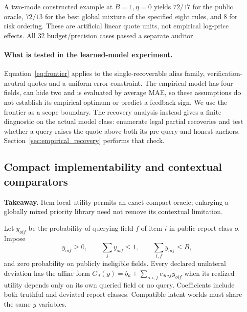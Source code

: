\documentclass[11pt]{article}
\begin{document}
A two-mode constructed example at $B=1,\eta=0$ yields $72/17$ for the public
oracle, $72/13$ for the best global mixture of the specified eight rules, and
$8$ for risk ordering. These are artificial linear quote units, not empirical
log-price effects. All 32 budget/precision cases passed a separate auditor.

\paragraph{What is tested in the learned-model experiment.}
Equation~\eqref{eq:frontier} applies to the single-recoverable alias family,
verification-neutral quotes and a uniform error constraint. The empirical
model has four fields, can hide two and is evaluated by average MAE, so these
assumptions do not establish its empirical optimum or predict a feedback sign.
We use the frontier as a scope boundary. The recovery analysis instead gives
a finite diagnostic on the actual model class: enumerate legal partial
recoveries and test whether a query raises the quote above both its pre-query
and honest anchors. Section~\ref{sec:empirical_recovery} performs that check.

\subsection{Compact implementability and contextual comparators}
\noindent\textbf{Takeaway.} Item-local utility permits an exact compact oracle;
enlarging a globally mixed priority library need not remove its contextual limitation.

Let $y_{oif}$ be the probability of querying field $f$ of item $i$ in public
report class $o$. Impose
\[
y_{oif}\ge0,\qquad \sum_f y_{oif}\le1,\qquad
\sum_{i,f}y_{oif}\le B,
\]
and zero probability on publicly ineligible fields. Every declared unilateral
deviation has the affine form $G_d(y)=b_d+\sum_{o,i,f}c_{doif}y_{oif}$ when its
realized utility depends only on its own queried field or no query. Coefficients
include both truthful and deviated report classes. Compatible latent worlds
must share the same $y$ variables.
\end{document}
